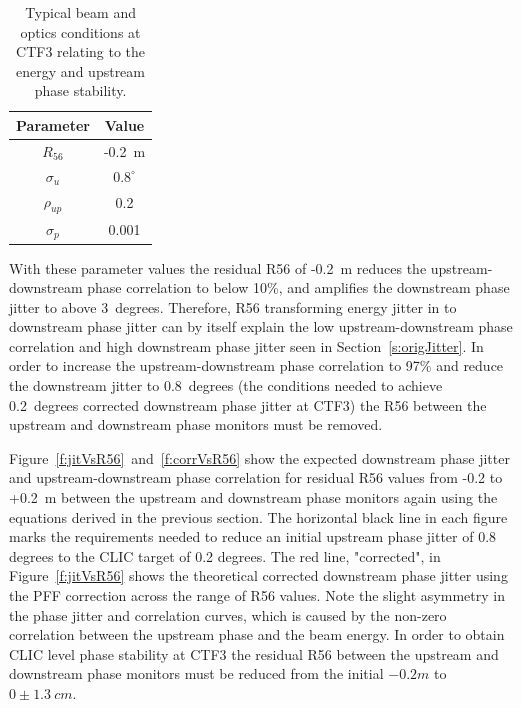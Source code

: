 \begin{table}
  \begin{center}
    \begin{tabular}{| c c |}
	   \hline
       Parameter & Value \\ \hline
       \(R_{56}\) & -0.2~m \\
       \(\sigma_u\) & \(0.8^\circ\) \\
       \(\rho_{up}\) & 0.2 \\
       \(\sigma_{p}\) & 0.001 \\ \hline
    \end{tabular}
    \caption{Typical beam and optics conditions at CTF3 relating to the energy and upstream phase stability.}
  	\label{t:r56Params}
  \end{center}
\end{table}

With these parameter values the residual R56 of -0.2~m reduces the upstream-downstream phase correlation to below 10\%, and amplifies the downstream phase jitter to above 3~degrees. Therefore, R56 transforming energy jitter in to downstream phase jitter can by itself explain the low upstream-downstream phase correlation and high downstream phase jitter seen in Section~\ref{s:origJitter}. In order to increase the upstream-downstream phase correlation to 97\% and reduce the downstream jitter to 0.8~degrees (the conditions needed to achieve 0.2~degrees corrected downstream phase jitter at CTF3) the R56 between the upstream and downstream phase monitors must be removed.

Figure~\ref{f:jitVsR56}~and~\ref{f:corrVsR56} show the expected downstream phase jitter and upstream-downstream phase correlation for residual R56 values from -0.2 to +0.2~m between the upstream and downstream phase monitors again using the equations derived in the previous section. The horizontal black line in each figure marks the requirements needed to reduce an initial upstream phase jitter of 0.8 degrees to the CLIC target of 0.2 degrees. The red line, "corrected", in Figure~\ref{f:jitVsR56} shows the theoretical corrected downstream phase jitter using the PFF correction across the range of R56 values. Note the slight asymmetry in the phase jitter and correlation curves, which is caused by the non-zero correlation between the upstream phase and the beam energy. In order to obtain CLIC level phase stability at CTF3 the residual R56 between the upstream and downstream phase monitors must be reduced from the initial \(-0.2m\) to \(0\pm1.3~cm\).


